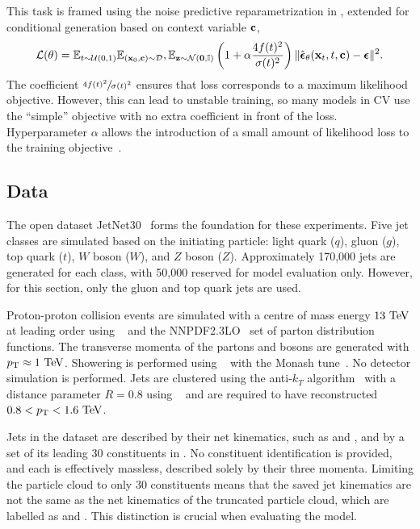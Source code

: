 This task is framed using the noise predictive reparametrization in , extended for conditional generation based on context variable $\mathbf{c}$,
\begin{equation}
    \label{eq:training_objective}
    \mathcal{L}(\theta) =
    \mathbb{E}_{t\sim \mathcal{U}(0, 1)}
    \mathbb{E}_{(\mathbf{x}_0, \mathbf{c}) \sim \mathcal{D}},
    \mathbb{E}_{\mathbf{z} \sim \mathcal{N}(\mathbf{0}, \mathbb{I})}
    \left(1 + \alpha \frac{4f(t)^2}{\sigma(t)^2}\right)
    \| \hat{\boldsymbol{\epsilon}}_\theta (\mathbf{x}_t, t, \mathbf{c}) - \boldsymbol{\epsilon} \|^2.
\end{equation}
The coefficient $\sfrac{4f(t)^2}{\sigma(t)^2}$ ensures that loss corresponds to a maximum likelihood objective.
However, this can lead to unstable training, so many models in CV use the ``simple'' objective with no extra coefficient in front of the loss.
Hyperparameter $\alpha$ allows the introduction of a small amount of likelihood loss to the training objective~\cite{ImprovedDenoisingDiffusion}.

\subsection{Data}
\label{sec:jetgen_data}

The open dataset JetNet30~\cite{MPGAN} forms the foundation for these experiments.
Five jet classes are simulated based on the initiating particle: light quark ($q$), gluon ($g$), top quark ($t$), $W$ boson ($W$), and $Z$ boson ($Z$).
Approximately 170,000 jets are generated for each class, with 50,000 reserved for model evaluation only.
However, for this section, only the gluon and top quark jets are used.

Proton-proton collision events are simulated with a centre of mass energy $13~\TeV$ at leading order using \madgraph~\cite{MadGraph} and the \textsc{NNPDF2.3LO}~\cite{PDF2.3} set of parton distribution functions.
The transverse momenta of the partons and bosons are generated with $\pt \approx 1~\TeV$.
Showering is performed using ~\cite{Pythia8} with the Monash tune~\cite{Monash}.
No detector simulation is performed.
Jets are clustered using the anti-$k_T$ algorithm~\cite{AntiKt} with a distance parameter $R=0.8$ using \fastjet~\cite{FastJet} and are required to have reconstructed $0.8 < \pt < 1.6~\TeV$.

Jets in the dataset are described by their net kinematics, such as \mjet and \ptjet, and by a set of its leading 30 constituents in \pt.
No constituent identification is provided, and each is effectively massless, described solely by their three momenta.
Limiting the particle cloud to only 30 constituents means that the saved jet kinematics are not the same as the net kinematics of the truncated particle cloud, which are labelled as \mpc and \ptpc.
This distinction is crucial when evaluating the model.

